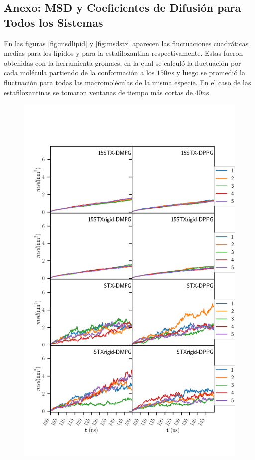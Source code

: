 \begin{appendix}
\chapter{Anexo: MSD y Coeficientes de Difusi\'{o}n para Todos los Sistemas}\label{AnexoC}
En las figuras \ref{fig:msdlipid} y \ref{fig:msdstx} aparecen las fluctuaciones cuadr\'{a}ticas medias para los l\'{i}pidos y para la estafiloxantina respectivamente. Estas fueron obtenidas con la herramienta gromacs, en la cual se calcul\'{o} la fluctuaci\'{o}n por cada mol\'{e}cula partiendo de la conformaci\'{o}n a los $150n$s y luego se promedi\'{o} la fluctuaci\'{o}n para todas las macromol\'{e}culas de la misma especie. En el caso de las estafiloxantinas se tomaron ventanas de tiempo m\'{a}s cortas de $40n$s.
\begin{figure}[h]
\begin{center}
    \includegraphics[scale=0.28,trim={0 2cm 0 6cm},clip]{Plots/msd_stx_40.png}

\end{center}
\end{figure}
\end{appendix}
